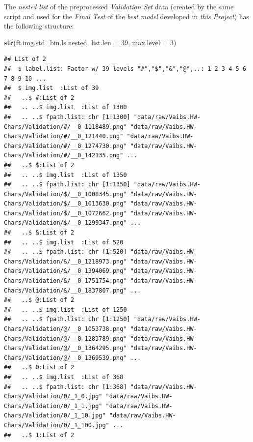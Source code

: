\documentclass[
]{report}
\newenvironment{Shaded}{\begin{snugshade}}{\end{snugshade}}
\newcommand{\AttributeTok}[1]{\textcolor[rgb]{0.13,0.29,0.53}{#1}}
\newcommand{\DecValTok}[1]{\textcolor[rgb]{0.00,0.00,0.81}{#1}}
\newcommand{\FunctionTok}[1]{\textcolor[rgb]{0.13,0.29,0.53}{\textbf{#1}}}
\newcommand{\NormalTok}[1]{#1}
\begin{document}
\normalsize

\newpage

The \emph{nested list} of the preprocessed \emph{Validation Set} data (created by the same script and used for the \emph{Final Test} of the \emph{best model} developed in \emph{this Project}) has the following structure:

\begin{Shaded}
\begin{Highlighting}[]
\FunctionTok{str}\NormalTok{(ft.img.std\_bin.ls.nested, }\AttributeTok{list.len =} \DecValTok{39}\NormalTok{, }\AttributeTok{max.level =} \DecValTok{3}\NormalTok{)}
\end{Highlighting}
\end{Shaded}

\footnotesize

\begin{verbatim}
## List of 2
##  $ label.list: Factor w/ 39 levels "#","$","&","@",..: 1 2 3 4 5 6 7 8 9 10 ...
##  $ img.list  :List of 39
##   ..$ #:List of 2
##   .. ..$ img.list  :List of 1300
##   .. ..$ fpath.list: chr [1:1300] "data/raw/Vaibs.HW-Chars/Validation/#/__0_1118489.png" "data/raw/Vaibs.HW-Chars/Validation/#/__0_121440.png" "data/raw/Vaibs.HW-Chars/Validation/#/__0_1274730.png" "data/raw/Vaibs.HW-Chars/Validation/#/__0_142135.png" ...
##   ..$ $:List of 2
##   .. ..$ img.list  :List of 1350
##   .. ..$ fpath.list: chr [1:1350] "data/raw/Vaibs.HW-Chars/Validation/$/__0_1008345.png" "data/raw/Vaibs.HW-Chars/Validation/$/__0_1013630.png" "data/raw/Vaibs.HW-Chars/Validation/$/__0_1072662.png" "data/raw/Vaibs.HW-Chars/Validation/$/__0_1299347.png" ...
##   ..$ &:List of 2
##   .. ..$ img.list  :List of 520
##   .. ..$ fpath.list: chr [1:520] "data/raw/Vaibs.HW-Chars/Validation/&/__0_1218973.png" "data/raw/Vaibs.HW-Chars/Validation/&/__0_1394069.png" "data/raw/Vaibs.HW-Chars/Validation/&/__0_1751754.png" "data/raw/Vaibs.HW-Chars/Validation/&/__0_1837807.png" ...
##   ..$ @:List of 2
##   .. ..$ img.list  :List of 1250
##   .. ..$ fpath.list: chr [1:1250] "data/raw/Vaibs.HW-Chars/Validation/@/__0_1053738.png" "data/raw/Vaibs.HW-Chars/Validation/@/__0_1283789.png" "data/raw/Vaibs.HW-Chars/Validation/@/__0_1364295.png" "data/raw/Vaibs.HW-Chars/Validation/@/__0_1369539.png" ...
##   ..$ 0:List of 2
##   .. ..$ img.list  :List of 368
##   .. ..$ fpath.list: chr [1:368] "data/raw/Vaibs.HW-Chars/Validation/0/_1_0.jpg" "data/raw/Vaibs.HW-Chars/Validation/0/_1_1.jpg" "data/raw/Vaibs.HW-Chars/Validation/0/_1_10.jpg" "data/raw/Vaibs.HW-Chars/Validation/0/_1_100.jpg" ...
##   ..$ 1:List of 2

\end{verbatim}
\end{document}
